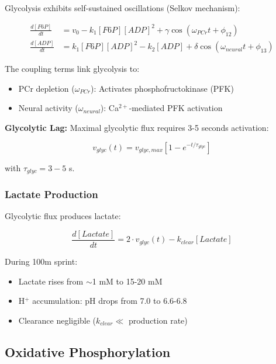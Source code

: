 Glycolysis exhibits self-sustained oscillations (Selkov mechanism):

\begin{align}
\frac{d[F6P]}{dt} &= v_0 - k_1 [F6P][ADP]^2 + \gamma \cos(\omega_{PCr} t + \phi_{12}) \label{eq:f6p_glyc}\\
\frac{d[ADP]}{dt} &= k_1 [F6P][ADP]^2 - k_2 [ADP] + \delta \cos(\omega_{neural} t + \phi_{13}) \label{eq:adp_glyc}
\end{align}

The coupling terms link glycolysis to:
\begin{itemize}
\item PCr depletion ($\omega_{PCr}$): Activates phosphofructokinase (PFK)
\item Neural activity ($\omega_{neural}$): Ca$^{2+}$-mediated PFK activation
\end{itemize}

\textbf{Glycolytic Lag:} Maximal glycolytic flux requires 3-5 seconds activation:

\begin{equation}
v_{glyc}(t) = v_{glyc,max} \left[1 - e^{-t/\tau_{glyc}}\right]
\label{eq:glycolytic_activation}
\end{equation}

with $\tau_{glyc} = 3-5$ s.

\subsubsection{Lactate Production}

Glycolytic flux produces lactate:

\begin{equation}
\frac{d[Lactate]}{dt} = 2 \cdot v_{glyc}(t) - k_{clear}[Lactate]
\label{eq:lactate_production}
\end{equation}

During 100m sprint:
\begin{itemize}
\item Lactate rises from $\sim$1 mM to 15-20 mM
\item H$^+$ accumulation: pH drops from 7.0 to 6.6-6.8
\item Clearance negligible ($k_{clear} \ll$ production rate)
\end{itemize}

\subsection{Oxidative Phosphorylation}

